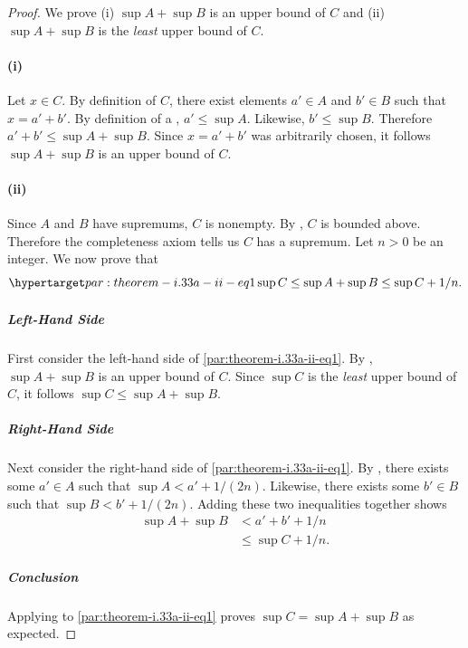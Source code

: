\documentclass{report}
\begin{document}
  \begin{proof}

    We prove (i) $\sup{A} + \sup{B}$ is an upper bound of $C$ and (ii)
      $\sup{A} + \sup{B}$ is the \textit{least} upper bound of $C$.

    \paragraph{(i)}%

      Let $x \in C$.
      By definition of $C$, there exist elements $a' \in A$ and $b' \in B$ such
        that $x = a' + b'$.
      By definition of a , $a' \leq \sup{A}$.
      Likewise, $b' \leq \sup{B}$.
      Therefore $a' + b' \leq \sup{A} + \sup{B}$.
      Since $x = a' + b'$ was arbitrarily chosen, it follows $\sup{A} + \sup{B}$
        is an upper bound of $C$.

    \paragraph{(ii)}%

      Since $A$ and $B$ have supremums, $C$ is nonempty.
      By , $C$ is bounded above.
      Therefore the completeness axiom tells us $C$ has a supremum.
      Let $n > 0$ be an integer.
      We now prove that
        \begin{equation}
          \hyperlabel{par:theorem-i.33a-ii-eq1}
          \sup{C} \leq \sup{A} + \sup{B} \leq \sup{C} + 1 / n.
        \end{equation}

      \subparagraph{Left-Hand Side}%

        First consider the left-hand side of \eqref{par:theorem-i.33a-ii-eq1}.
        By , $\sup{A} + \sup{B}$ is an upper bound
          of $C$.
        Since $\sup{C}$ is the \textit{least} upper bound of $C$, it follows
          $\sup{C} \leq \sup{A} + \sup{B}$.

      \subparagraph{Right-Hand Side}%

        Next consider the right-hand side of \eqref{par:theorem-i.33a-ii-eq1}.
        By , there exists some $a' \in A$ such that
          $\sup{A} < a' + 1 / (2n)$.
        Likewise, there exists some $b' \in B$ such that
          $\sup{B} < b' + 1 / (2n)$.
        Adding these two inequalities together shows
          \begin{align*}
            \sup{A} + \sup{B}
              & < a' + b' + 1 / n \\
              & \leq \sup{C} + 1 / n.
          \end{align*}

      \subparagraph{Conclusion}%

        Applying  to \eqref{par:theorem-i.33a-ii-eq1}
          proves $\sup{C} = \sup{A} + \sup{B}$ as expected.

  \end{proof}
\end{document}
